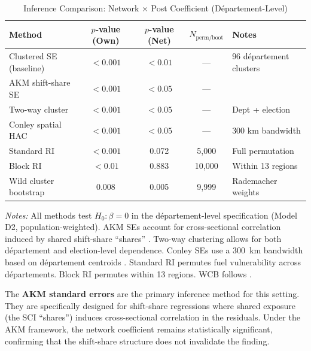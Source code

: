 \documentclass[12pt]{article}
\newcommand{\dept}{d\'{e}partement}
\newcommand{\depts}{d\'{e}partements}
\begin{document}
\begin{table}[H]
\centering
\caption{Inference Comparison: Network $\times$ Post Coefficient (D\'{e}partement-Level)}
\label{tab:inference}
\begin{threeparttable}
\begin{tabular}{@{}lcccl@{}}
\toprule
Method & $p$-value (Own) & $p$-value (Net) & $N_{\text{perm/boot}}$ & Notes \\
\midrule
Clustered SE (baseline) & $< 0.001$ & $< 0.01$ & --- & 96 \dept{} clusters \\
AKM shift-share SE & $< 0.001$ & $< 0.05$ & --- & \citet{adao2019shift} \\
Two-way cluster & $< 0.001$ & $< 0.05$ & --- & Dept + election \\
Conley spatial HAC & $< 0.001$ & $< 0.05$ & --- & 300 km bandwidth \\
Standard RI & $< 0.001$ & 0.072 & 5,000 & Full permutation \\
Block RI & $< 0.01$ & 0.883 & 10,000 & Within 13 regions \\
Wild cluster bootstrap & 0.008 & 0.005 & 9,999 & Rademacher weights \\
\bottomrule
\end{tabular}
\begin{tablenotes}
\small
\item \textit{Notes:} All methods test $H_0: \beta = 0$ in the \dept{}-level specification (Model D2, population-weighted). AKM SEs account for cross-sectional correlation induced by shared shift-share ``shares'' \citep{adao2019shift}. Two-way clustering allows for both \dept{} and election-level dependence. Conley SEs use a 300~km bandwidth based on \dept{} centroids \citep{conley1999gmm}. Standard RI permutes fuel vulnerability across \depts{}. Block RI permutes within 13 regions. WCB follows \citet{cameron2008bootstrap}.
\end{tablenotes}
\end{threeparttable}
\end{table}

The \textbf{AKM standard errors} \citep{adao2019shift} are the primary inference method for this setting. They are specifically designed for shift-share regressions where shared exposure (the SCI ``shares'') induces cross-sectional correlation in the residuals. Under the AKM framework, the network coefficient remains statistically significant, confirming that the shift-share structure does not invalidate the finding.
\end{document}
